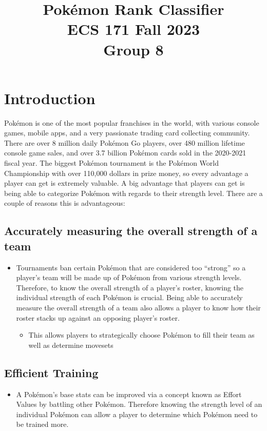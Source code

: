 \documentclass[conference]{IEEEtran}
\title{%
  Pokémon Rank Classifier \\
  \large ECS 171 Fall 2023 \\
    Group 8}
\author{
\IEEEauthorblockN{Alexander D'souza}
\and
\IEEEauthorblockN{Catherine Chen}
\and
\IEEEauthorblockN{Shane Kim}
\and
\IEEEauthorblockN{Varun Wadhwa}
}
\begin{document}
    \maketitle
\section{Introduction}
Pokémon is one of the most popular franchises in the world, with various console games, mobile apps, and a very passionate trading card collecting community. There are over 8 million daily Pokémon Go players, over 480 million lifetime console game sales, and over 3.7 billion Pokémon cards sold in the 2020-2021 fiscal year. The biggest Pokémon tournament is the Pokémon World Championship with over 110,000 dollars in prize money, so every advantage a player can get is extremely valuable. A big advantage that players can get is being able to categorize Pokémon with regards to their strength level. There are a couple of reasons this is advantageous:


\subsection{Accurately measuring the overall strength of a team}
\begin{itemize}
\item Tournaments ban certain Pokémon that are considered too “strong” so a player's team will be made up of Pokémon from various strength levels. Therefore, to know the overall strength of a player's roster, knowing the individual strength of each Pokémon is crucial. Being able to accurately measure the overall strength of a team also allows a player to know how their roster stacks up against an opposing player's roster. 
\begin{itemize}
    \item This allows players to strategically choose Pokémon to fill their team as well as determine movesets
\end{itemize}  
\end{itemize}
\subsection{Efficient Training}
\begin{itemize}
    \item A Pokémon's base stats can be improved via a concept known as Effort Values by battling other Pokémon. Therefore knowing the strength level of an individual Pokémon can allow a player to determine which Pokémon need to be trained more.
\end{itemize}
\end{document}
